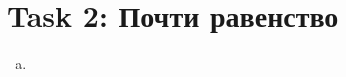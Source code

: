 \section{Task 2: Почти равенство}
\begin{solution}
    \begin{enumerate}[a)]
        \item 
    \end{enumerate}    
\end{solution}